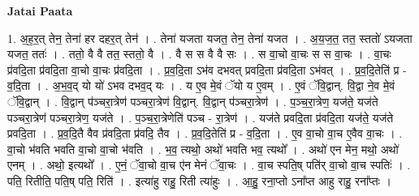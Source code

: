 \documentclass[17pt]{extarticle}
\begin{document}
\textbf{Jatai Paata} \newline

1. अ॒ह॒र॒त् तेन॒ तेना॑ हर दहर॒त् तेन॑ । . तेना॑ यजता यजत॒ तेन॒ तेना॑ यजत । . अ॒य॒ज॒त॒ तत॒ स्ततो॑ ऽयजता यजत॒ ततः॑ । . ततो॒ वै वै तत॒ स्ततो॒ वै । . वै स स वै वै सः । . स वा॒चो वा॒चः स स वा॒चः । . वा॒चः प्र॑वदि॒ता प्र॑वदि॒ता वा॒चो वा॒चः प्र॑वदि॒ता । . प्र॒व॒दि॒ता ऽभ॑व दभवत् प्रवदि॒ता प्र॑वदि॒ता ऽभ॑वत् । . प्र॒व॒दि॒तेति॑ प्र - व॒दि॒ता । . अ॒भ॒व॒द् यो यो॑ ऽभव दभव॒द् यः । . य ए॒व मे॒वं ॅयो य ए॒वम् । . ए॒वं ॅवि॒द्वान्. वि॒द्वा ने॒व मे॒वं ॅवि॒द्वान् । . वि॒द्वान् प॑ञ्चरा॒त्रेण॑ पञ्चरा॒त्रेण॑ वि॒द्वान्. वि॒द्वान् प॑ञ्चरा॒त्रेण॑ । . प॒ञ्च॒रा॒त्रेण॒ यज॑ते॒ यज॑ते पञ्चरा॒त्रेण॑ पञ्चरा॒त्रेण॒ यज॑ते । . प॒ञ्च॒रा॒त्रेणेति॑ पञ्च - रा॒त्रेण॑ । . यज॑ते प्रवदि॒ता प्र॑वदि॒ता यज॑ते॒ यज॑ते प्रवदि॒ता । . प्र॒व॒दि॒तै वैव प्र॑वदि॒ता प्र॑वदि॒ तैव । . प्र॒व॒दि॒तेति॑ प्र - व॒दि॒ता । . ए॒व वा॒चो वा॒च ए॒वैव वा॒चः । . वा॒चो भ॑वति भवति वा॒चो वा॒चो भ॑वति । . भ॒व॒ त्यथो॒ अथो॑ भवति भव॒ त्यथो᳚ । . अथो॑ एन मेन॒ मथो॒ अथो॑ एनम् । . अथो॒ इत्यथो᳚ । . ए॒नं॒ ॅवा॒चो वा॒च ए॑न मेनं ॅवा॒चः । . वा॒च स्पति॒ष् पति॑र् वा॒चो वा॒च स्पतिः॑ । . पति॒ रितीति॒ पति॒ष् पति॒ रिति॑ । . इत्या॑हु राहु॒ रिती त्या॑हुः । . आ॒हु॒ रना॒प्तो ऽना᳚प्त आहु राहु॒ रना᳚प्तः । \newline
\end{document}
